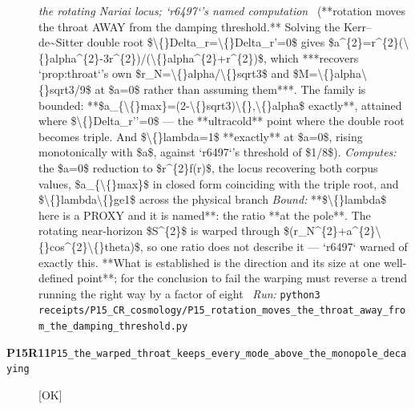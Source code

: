 \begin{description}
\textit{the rotating Nariai locus; `r6497`'s named computation} \ (**rotation moves the throat AWAY from the damping threshold.** Solving the Kerr--de\textasciitilde{}Sitter double root \$\textbackslash\{\}Delta\_r=\textbackslash\{\}Delta\_r'=0\$ gives \$a\textasciicircum{}\{2\}=r\textasciicircum{}\{2\}(\textbackslash\{\}alpha\textasciicircum{}\{2\}-3r\textasciicircum{}\{2\})/(\textbackslash\{\}alpha\textasciicircum{}\{2\}+r\textasciicircum{}\{2\})\$, which ***recovers `prop:throat`'s own \$r\_N=\textbackslash\{\}alpha/\textbackslash\{\}sqrt3\$ and \$M=\textbackslash\{\}alpha\textbackslash\{\}sqrt3/9\$ at \$a=0\$ rather than assuming them***. The family is bounded: **\$a\_\{\textbackslash\{\}max\}=(2-\textbackslash\{\}sqrt3)\textbackslash\{\},\textbackslash\{\}alpha\$ exactly**, attained where \$\textbackslash\{\}Delta\_r''=0\$ --- the **ultracold** point where the double root becomes triple. And \$\textbackslash\{\}lambda=1\$ **exactly** at \$a=0\$, rising monotonically with \$a\$, against `r6497`'s threshold of \$1/8\$). 
\emph{Computes:} the \$a=0\$ reduction to \$r\textasciicircum{}\{2\}f(r)\$, the locus recovering both corpus values, \$a\_\{\textbackslash\{\}max\}\$ in closed form coinciding with the triple root, and \$\textbackslash\{\}lambda\textbackslash\{\}ge1\$ across the physical branch
 \emph{Bound:}  **\$\textbackslash\{\}lambda\$ here is a PROXY and it is named**: the ratio **at the pole**. The rotating near-horizon \$S\textasciicircum{}\{2\}\$ is warped through \$(r\_N\textasciicircum{}\{2\}+a\textasciicircum{}\{2\}\textbackslash\{\}cos\textasciicircum{}\{2\}\textbackslash\{\}theta)\$, so one ratio does not describe it --- `r6497` warned of exactly this. **What is established is the direction and its size at one well-defined point**; for the conclusion to fail the warping must reverse a trend running the right way by a factor of eight
\ \emph{Run:} \texttt{python3 receipts/P15\_CR\_cosmology/P15\_rotation\_moves\_the\_throat\_away\_from\_the\_damping\_threshold.py}
\item[\rcptlabel{P15_the_warped_throat_keeps_every_mode_above_the_monopole_decaying}{P15R11}\textbf{P15R11}\quad\texttt{P15\_the\_warped\_throat\_keeps\_every\_mode\_above\_the\_monopole\_decaying}]\hfill\textsf{[OK]}\\

\end{description}
